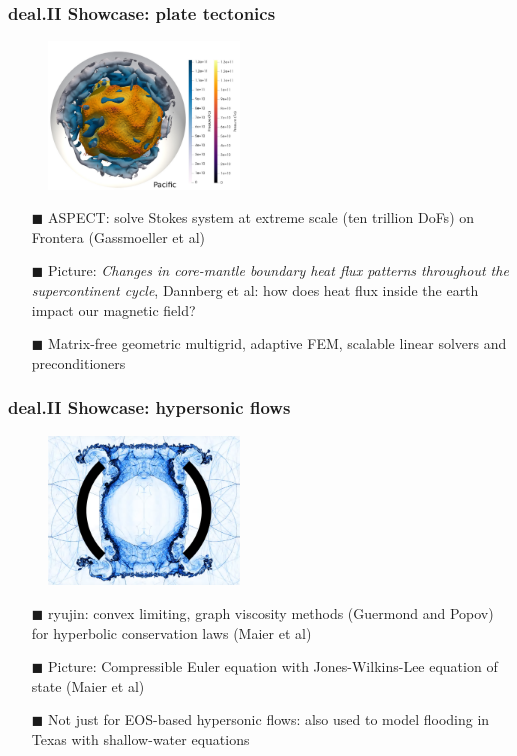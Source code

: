 \documentclass[8pt]{beamer}
\begin{document}
\begin{frame}
    \frametitle{deal.II Showcase: plate tectonics}
    \begin{figure}
        \centering
        \includegraphics[width=2in]{aspect.png}
    \end{figure}
    \begin{itemize}
        \item[$\blacksquare$] ASPECT: solve Stokes system at extreme scale (ten trillion DoFs) on Frontera (Gassmoeller et al)
        \item[$\blacksquare$] Picture: \emph{Changes in core-mantle boundary heat ﬂux
          patterns throughout the supercontinent cycle}, Dannberg et al: how does heat flux inside the earth impact our magnetic field?
        \item[$\blacksquare$] Matrix-free geometric multigrid, adaptive FEM,
          scalable linear solvers and preconditioners
    \end{itemize}
\end{frame}

\begin{frame}
    \frametitle{deal.II Showcase: hypersonic flows}
    \begin{figure}
        \centering
        \includegraphics[width=2in]{ryujin.png}
    \end{figure}
    \begin{itemize}
        \item[$\blacksquare$] ryujin: convex limiting, graph viscosity methods
          (Guermond and Popov) for hyperbolic conservation laws (Maier et al)
        \item[$\blacksquare$] Picture: Compressible Euler equation with
          Jones-Wilkins-Lee equation of state (Maier et al)
        \item[$\blacksquare$] Not just for EOS-based hypersonic flows: also used
          to model flooding in Texas with shallow-water equations
    \end{itemize}
\end{frame}
\end{document}
